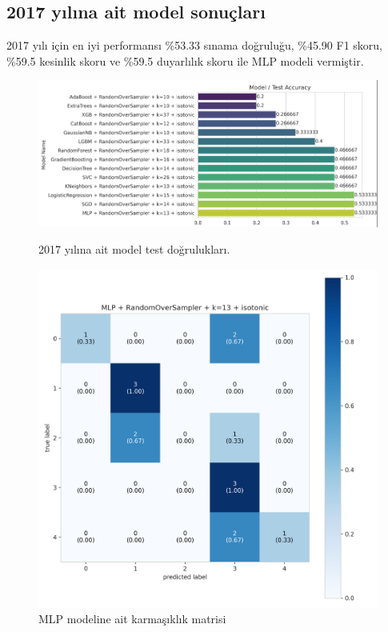 \newpage

\subsection{2017 yılına ait model sonuçları}
2017 yılı için en iyi performansı \%53.33 sınama doğruluğu,  \%45.90 F1 skoru, \%59.5 kesinlik skoru ve \%59.5 duyarlılık skoru ile MLP modeli vermiştir.

\begin{figure}[ht]
\centering
\begin{minipage}[b]{0.6\textwidth}
    \centering
    \includegraphics[width=\textwidth]{2017.png}
    \caption{2017 yılına ait model test doğrulukları.}
    \label{fig:resim1}
\end{minipage}
\hfill
\begin{minipage}[b]{0.6\textwidth}
    \centering
    \includegraphics[width=\textwidth]{2017_cm.png}
    \caption{MLP modeline ait karmaşıklık matrisi}
    \label{fig:resim2}
\end{minipage}
\end{figure}

